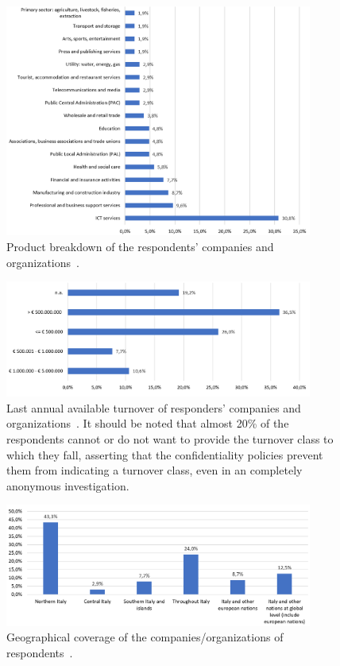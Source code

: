 \documentclass{easychair}
\begin{document}
\begin{figure}
	\centering
	\includegraphics[width=0.90\textwidth]{pictures/fig9.png}
	\caption{Product breakdown of the respondents' companies and organizations~\cite{oad20}.}
	\label{fig:9}
\end{figure}

\begin{figure}
	\centering
	\includegraphics[width=0.90\textwidth]{pictures/fig7.png}
	\caption{Last annual available turnover of responders' companies and organizations~\cite{oad20}. 
	  It should be noted that almost 20\% of the respondents cannot or do not want
          to provide the turnover class to which they fall, asserting that the confidentiality
          policies prevent them from indicating a turnover class,
          even in an completely anonymous investigation.
	}
	\label{fig:7}
\end{figure}

\begin{figure}
	\centering
	\includegraphics[width=0.90\textwidth]{pictures/fig8.png}
	\caption{Geographical coverage of the companies/organizations of respondents~\cite{oad20}.}
	\label{fig:8}
\end{figure}
\end{document}
